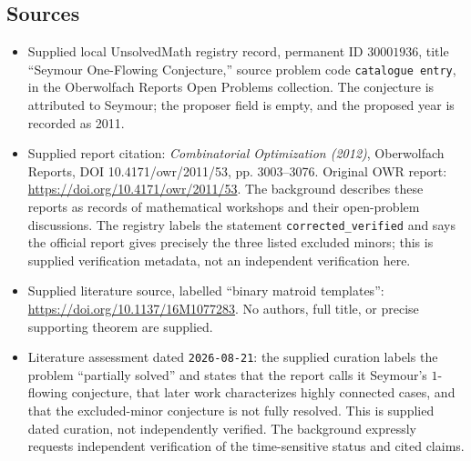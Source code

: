 \documentclass[11pt]{article}
\begin{document}
\subsection{Sources}
\begin{itemize}
\item Supplied local UnsolvedMath registry record, permanent ID \(30001936\), title ``Seymour One-Flowing Conjecture,'' source problem code \texttt{catalogue entry}, in the Oberwolfach Reports Open Problems collection. The conjecture is attributed to Seymour; the proposer field is empty, and the proposed year is recorded as 2011.
\item Supplied report citation: \emph{Combinatorial Optimization (2012)}, Oberwolfach Reports, DOI 10.4171/owr/2011/53, pp. 3003--3076. Original OWR report: \url{https://doi.org/10.4171/owr/2011/53}. The background describes these reports as records of mathematical workshops and their open-problem discussions. The registry labels the statement \texttt{corrected\_verified} and says the official report gives precisely the three listed excluded minors; this is supplied verification metadata, not an independent verification here.
\item Supplied literature source, labelled ``binary matroid templates'': \url{https://doi.org/10.1137/16M1077283}. No authors, full title, or precise supporting theorem are supplied.
\item Literature assessment dated \texttt{2026-08-21}: the supplied curation labels the problem ``partially solved'' and states that the report calls it Seymour's \(1\)-flowing conjecture, that later work characterizes highly connected cases, and that the excluded-minor conjecture is not fully resolved. This is supplied dated curation, not independently verified. The background expressly requests independent verification of the time-sensitive status and cited claims.
\end{itemize}
\end{document}
